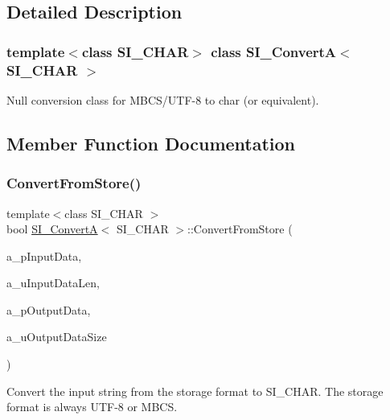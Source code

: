 \subsection{Detailed Description}
\subsubsection*{template$<$class S\+I\+\_\+\+C\+H\+AR$>$\newline
class S\+I\+\_\+\+Convert\+A$<$ S\+I\+\_\+\+C\+H\+A\+R $>$}

Null conversion class for M\+B\+C\+S/\+U\+T\+F-\/8 to char (or equivalent). 

\subsection{Member Function Documentation}
\mbox{\label{a00925_a5176a6dc2dc6482280e9a08dd3607f9e}} 
\subsubsection{\texorpdfstring{Convert\+From\+Store()}{ConvertFromStore()}}
{\footnotesize\ttfamily template$<$class S\+I\+\_\+\+C\+H\+AR $>$ \\
bool \hyperlink{a00925}{S\+I\+\_\+\+ConvertA}$<$ S\+I\+\_\+\+C\+H\+AR $>$\+::Convert\+From\+Store (\begin{DoxyParamCaption}\item[{const char $\ast$}]{a\+\_\+p\+Input\+Data,  }\item[{size\+\_\+t}]{a\+\_\+u\+Input\+Data\+Len,  }\item[{S\+I\+\_\+\+C\+H\+AR $\ast$}]{a\+\_\+p\+Output\+Data,  }\item[{size\+\_\+t}]{a\+\_\+u\+Output\+Data\+Size }\end{DoxyParamCaption})\hspace{0.3cm}{\ttfamily [inline]}}

Convert the input string from the storage format to S\+I\+\_\+\+C\+H\+AR. The storage format is always U\+T\+F-\/8 or M\+B\+CS.


